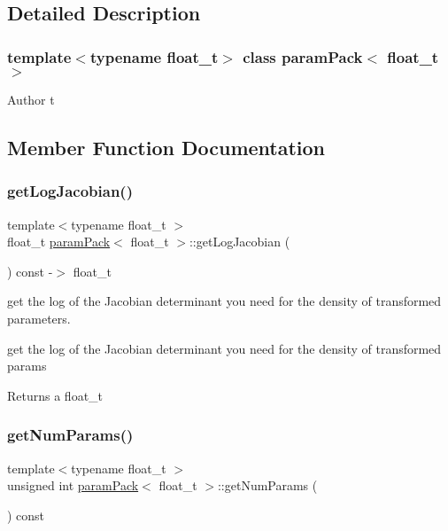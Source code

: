\subsection{Detailed Description}
\subsubsection*{template$<$typename float\+\_\+t$>$\newline
class param\+Pack$<$ float\+\_\+t $>$}

\begin{DoxyAuthor}{Author}
t 
\end{DoxyAuthor}


\subsection{Member Function Documentation}
\mbox{\label{classparamPack_a0febeb3a640212940e0ef351dae5a599}} 
\subsubsection{\texorpdfstring{get\+Log\+Jacobian()}{getLogJacobian()}}
{\footnotesize\ttfamily template$<$typename float\+\_\+t $>$ \\
float\+\_\+t \hyperlink{classparamPack}{param\+Pack}$<$ float\+\_\+t $>$\+::get\+Log\+Jacobian (\begin{DoxyParamCaption}{ }\end{DoxyParamCaption}) const -\/$>$ float\+\_\+t}



get the log of the Jacobian determinant you need for the density of transformed parameters. 

get the log of the Jacobian determinant you need for the density of transformed params \begin{DoxyReturn}{Returns}
a float\+\_\+t 
\end{DoxyReturn}
\mbox{\label{classparamPack_ad9df1725f12d795a3abeddfca0485cda}} 
\subsubsection{\texorpdfstring{get\+Num\+Params()}{getNumParams()}}
{\footnotesize\ttfamily template$<$typename float\+\_\+t $>$ \\
unsigned int \hyperlink{classparamPack}{param\+Pack}$<$ float\+\_\+t $>$\+::get\+Num\+Params (\begin{DoxyParamCaption}{ }\end{DoxyParamCaption}) const}



